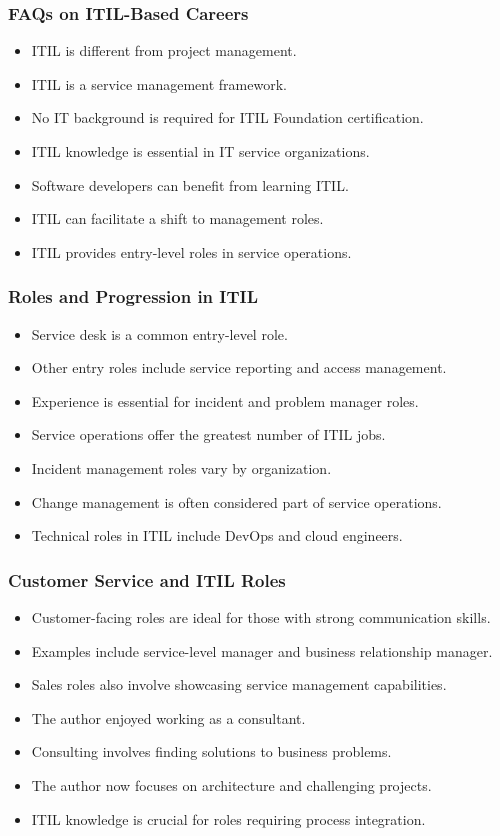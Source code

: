 \documentclass[aspectratio=169, table]{beamer}
\begin{document}
\begin{frame}
	\frametitle{FAQs on ITIL-Based Careers}
	\begin{itemize}
		\item ITIL is different from project management.
		\item ITIL is a service management framework.
		\item No IT background is required for ITIL Foundation certification.
		\item ITIL knowledge is essential in IT service organizations.
		\item Software developers can benefit from learning ITIL.
		\item ITIL can facilitate a shift to management roles.
		\item ITIL provides entry-level roles in service operations.
	\end{itemize}
\end{frame}

\begin{frame}
	\frametitle{Roles and Progression in ITIL}
	\begin{itemize}
		\item Service desk is a common entry-level role.
		\item Other entry roles include service reporting and access management.
		\item Experience is essential for incident and problem manager roles.
		\item Service operations offer the greatest number of ITIL jobs.
		\item Incident management roles vary by organization.
		\item Change management is often considered part of service operations.
		\item Technical roles in ITIL include DevOps and cloud engineers.
	\end{itemize}
\end{frame}

\begin{frame}
	\frametitle{Customer Service and ITIL Roles}
	\begin{itemize}
		\item Customer-facing roles are ideal for those with strong communication skills.
		\item Examples include service-level manager and business relationship manager.
		\item Sales roles also involve showcasing service management capabilities.
		\item The author enjoyed working as a consultant.
		\item Consulting involves finding solutions to business problems.
		\item The author now focuses on architecture and challenging projects.
		\item ITIL knowledge is crucial for roles requiring process integration.
	\end{itemize}
\end{frame}
\end{document}
